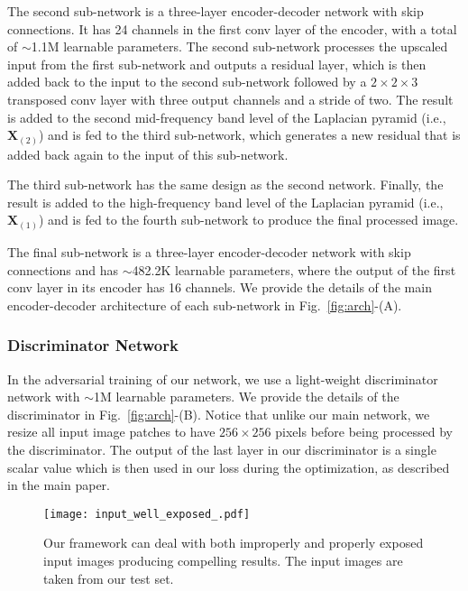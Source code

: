 \documentclass[final]{cvpr}
\begin{document}
The second sub-network is a three-layer encoder-decoder network with skip connections. It has 24 channels in the first conv layer of the encoder, with a total of $\sim$1.1M learnable parameters. The second sub-network processes the upscaled input from the first sub-network and outputs a residual layer, which is then added back to the input to the second sub-network followed by a $2\!\times\!2\!\times\!3$ transposed conv layer with three output channels and a stride of two. The result is added to the second mid-frequency band level of the Laplacian pyramid (i.e., $\mathbf{X}_{(2)}$) and is fed to the third sub-network, which generates a new residual that is added back again to the input of this sub-network. 

The third sub-network has the same design as the second network.  Finally, the result is added to the high-frequency band level of the Laplacian pyramid (i.e., $\mathbf{X}_{(1)}$) and is fed to the fourth sub-network to produce the final processed image. 


The final sub-network is a three-layer encoder-decoder network with skip connections and has $\sim$482.2K learnable parameters, where the output of the first conv layer in its encoder has 16 channels. We provide the details of the main encoder-decoder architecture of each sub-network in Fig.\ \ref{fig:arch}-(A).







\subsubsection{Discriminator Network}
In the adversarial training of our network, we use a light-weight discriminator network with $\sim$1M learnable parameters. We provide the details of the discriminator in Fig.\ \ref{fig:arch}-(B). Notice that unlike our main network, we resize all input image patches to have $256\!\times\!256$ pixels before being processed by the discriminator. The output of the last layer in our discriminator is a single scalar value which is then used in our loss during the optimization, as described in the main paper.




 \begin{figure*}[t]
 \centering
 \texttt{[image: input\_well\_exposed\_.pdf]}
 \vspace{-2mm}
 \caption{Our framework can deal with both improperly and properly exposed input images producing compelling results. The input images are taken from our test set.\vspace{-2mm}}
 \label{fig:input_well_exposed}
 \end{figure*}
 
\end{document}
